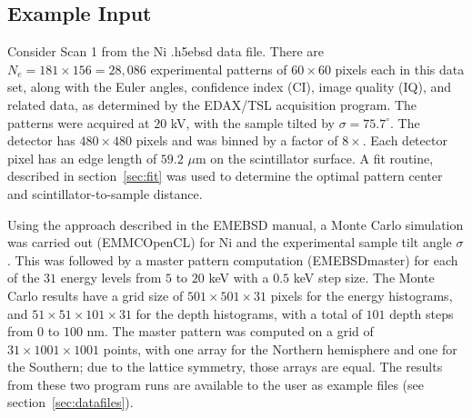 \documentclass[DIV=calc, paper=letter, fontsize=11pt]{scrartcl}	 %
\begin{document}
\subsection{Example Input}
Consider \textsf{Scan 1} from the Ni \textsf{.h5ebsd} data file.  There are $N_e=181\times 156=28,086$ experimental patterns of $60\times 60$ pixels each in this data set,
along with the Euler angles, confidence index (CI), image quality (IQ), and related data, as determined by the EDAX/TSL acquisition program.  The patterns were acquired
at $20$ kV, with the sample tilted by $\sigma=75.7^{\circ}$. The detector has $480\times 480$ pixels and was binned by a factor of $8\times$. Each detector pixel has an 
edge length of $59.2$ $\mu$m on the scintillator surface.  A fit routine, described in section~\ref{sec:fit} was used to determine the optimal pattern center and scintillator-to-sample
distance.

Using the approach described in the \textsf{EMEBSD} manual, a Monte Carlo simulation was carried out (\textsf{EMMCOpenCL}) 
for Ni and the experimental sample tilt angle $\sigma$. This was followed by a master pattern computation (\textsf{EMEBSDmaster}) for 
each of the $31$ energy levels from $5$ to $20$ keV with a $0.5$ keV step size.  The Monte Carlo results have a grid size of $501\times 501\times 31$ 
pixels for the energy histograms, and $51\times 51\times 101\times 31$ for the depth histograms, with a total of $101$ depth steps from $0$ to $100$ nm.
The master pattern was computed on a grid of $31\times 1001\times 1001$ points, with one array for the Northern hemisphere and one for the Southern;
due to the lattice symmetry, those arrays are equal.  The results from these two program runs are available to the user as example files (see section~\ref{sec:datafiles}).
\end{document}
